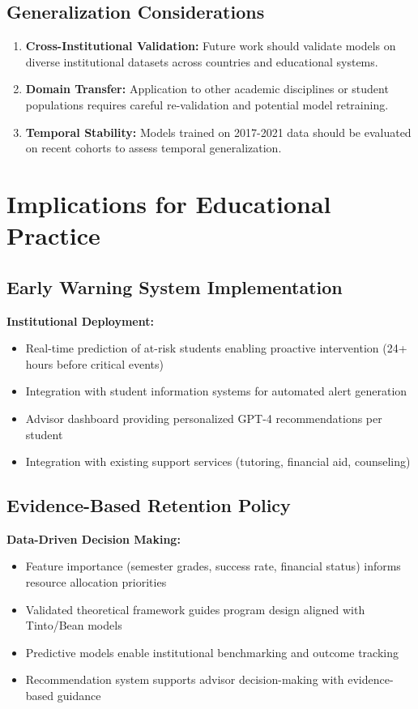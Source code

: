 \subsection{Generalization Considerations}

\begin{enumerate}
\item \textbf{Cross-Institutional Validation:} Future work should validate models on diverse institutional datasets across countries and educational systems.

\item \textbf{Domain Transfer:} Application to other academic disciplines or student populations requires careful re-validation and potential model retraining.

\item \textbf{Temporal Stability:} Models trained on 2017-2021 data should be evaluated on recent cohorts to assess temporal generalization.
\end{enumerate}

\section{Implications for Educational Practice}

\subsection{Early Warning System Implementation}

\textbf{Institutional Deployment:}
\begin{itemize}
\item Real-time prediction of at-risk students enabling proactive intervention (24+ hours before critical events)
\item Integration with student information systems for automated alert generation
\item Advisor dashboard providing personalized GPT-4 recommendations per student
\item Integration with existing support services (tutoring, financial aid, counseling)
\end{itemize}

\subsection{Evidence-Based Retention Policy}

\textbf{Data-Driven Decision Making:}
\begin{itemize}
\item Feature importance (semester grades, success rate, financial status) informs resource allocation priorities
\item Validated theoretical framework guides program design aligned with Tinto/Bean models
\item Predictive models enable institutional benchmarking and outcome tracking
\item Recommendation system supports advisor decision-making with evidence-based guidance
\end{itemize}

